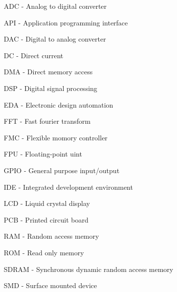 \documentclass[a4paper,twoside,12pt]{book}
\begin{document}
\begin{itemize}
\item[ADC] - Analog to digital converter
\item[API] - Application programming interface
\item[DAC] - Digital to analog converter
\item[DC] - Direct current
\item[DMA] - Direct memory access
\item[DSP] - Digital signal processing
\item[EDA] - Electronic design automation
\item[FFT] - Fast fourier transform
\item[FMC] - Flexible momory controller
\item[FPU] - Floating-point uint
\item[GPIO] - General purpose input/output
\item[IDE] - Integrated development environment
\item[LCD] - Liquid crystal display
\item[PCB] - Printed circuit board
\item[RAM] - Random access memory
\item[ROM] - Read only memory
\item[SDRAM] - Synchronous dynamic random access memory
\item[SMD] - Surface mounted device
\end{itemize}
\end{document}

